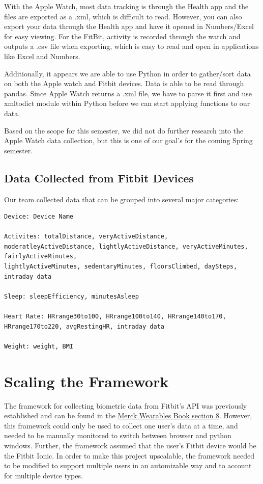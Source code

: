 \documentclass[]{book}
\begin{document}
With the Apple Watch, most data tracking is through the Health app and
the files are exported as a .xml, which is difficult to read. However,
you can also export your data through the Health app and have it opened
in Numbers/Excel for easy viewing. For the FitBit, activity is recorded
through the watch and outputs a .csv file when exporting, which is easy
to read and open in applications like Excel and Numbers.

Additionally, it appears we are able to use Python in order to
gather/sort data on both the Apple watch and Fitbit devices. Data is
able to be read through pandas. Since Apple Watch returns a .xml file,
we have to parse it first and use xmltodict module within Python before
we can start applying functions to our data.

Based on the scope for this semester, we did not do further research
into the Apple Watch data collection, but this is one of our goal's for
the coming Spring semester.

\subsection{Data Collected from Fitbit
Devices}\label{data-collected-from-fitbit-devices}

Our team collected data that can be grouped into several major
categories:

\begin{verbatim}
Device: Device Name

Activites: totalDistance, veryActiveDistance, moderatleyActiveDistance, lightlyActiveDistance, veryActiveMinutes, fairlyActiveMinutes, 
lightlyActiveMinutes, sedentaryMinutes, floorsClimbed, daySteps, intraday data

Sleep: sleepEfficiency, minutesAsleep

Heart Rate: HRrange30to100, HRrange100to140, HRrange140to170, HRrange170to220, avgRestingHR, intraday data

Weight: weight, BMI
\end{verbatim}

\section{Scaling the Framework}\label{scaling-the-framework}

The framework for collecting biometric data from Fitbit's API was
previously established and can be found in the
\href{https://nicholasrosenorn.github.io/wearables-book/tutorial-data-capture-in-python.html\#authentication}{Merck
Wearables Book section 8}. However, this framework could only be used to
collect one user's data at a time, and needed to be manually monitored
to switch between browser and python windows. Further, the framework
assumed that the user's Fitbit device would be the Fitbit Ionic. In
order to make this project upscalable, the framework needed to be
modified to support multiple users in an automizable way and to account
for multiple device types.
\end{document}
